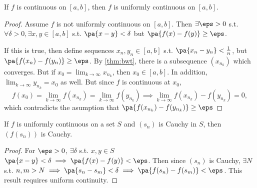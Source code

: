 \documentclass[11pt]{scrartcl}
\numberwithin{equation}{section}
\begin{document}
\begin{theorem}
    If $f$ is continuous on $[a,b]$, then $f$ is uniformly continuous 
    on $[a,b]$.
\end{theorem}

\begin{proof}
    Assume $f$ is not uniformly continuous on $[a,b]$. 
    Then $\exists \eps>0$ s.t. $\forall \delta>0, \exists x,y \in [a,b]$
    s.t. $\pa{x-y} < \delta$ but $\pa{f(x)-f(y)}\geq \eps$.

    If this is true, then define sequences $x_n, y_n\in [a,b]$ s.t.
    $\pa{x_n-y_n}<\frac{1}{n}$, but $\pa{f(x_n)-f(y_n)} \geq \eps$.
    By \cref{thm:bwt}, there is a subsequence $(x_{n_k})$ 
    which converges. But if $x_0=\lim_{k\rightarrow \infty}x_{n_k}$,
    then $x_0\in [a,b]$. In addition, $\lim_{k\rightarrow \infty}y_{n_k}=x_0$ as well. But since $f$ is continuous at $x_0$, 
    \[ f(x_0) = \lim_{k\rightarrow \infty}f(x_{n_k})= \lim_{k\rightarrow \infty}f(y_{n_k}) \implies \lim_{k\rightarrow \infty}f(x_{n_k})-f(y_{n_k}) = 0, \]
    which contradicts the asumption that 
    $\pa{f(x_{n_k})-f(y_{n_k})} \geq \eps$
\end{proof}

\begin{theorem}
    If $f$ is uniformly continuous on a set $S$ and $(s_n)$ is Cauchy 
    in $S$, then $(f(s_n))$ is Cauchy.
\end{theorem}

\begin{proof}
    For $\eps>0$, $\exists \delta$ s.t. $x,y\in S$ $\pa{x-y}<\delta 
    \implies \pa{f(x)-f(y)}<\eps$. Then since $(s_n)$ is Cauchy, 
    $\exists N$ s.t. $n,m > N \implies \pa{s_n-s_m}<\delta\implies \pa{f(s_n)-f(s_m)}<\eps$.
    This result requires uniform continuity.
\end{proof}
\end{document}
